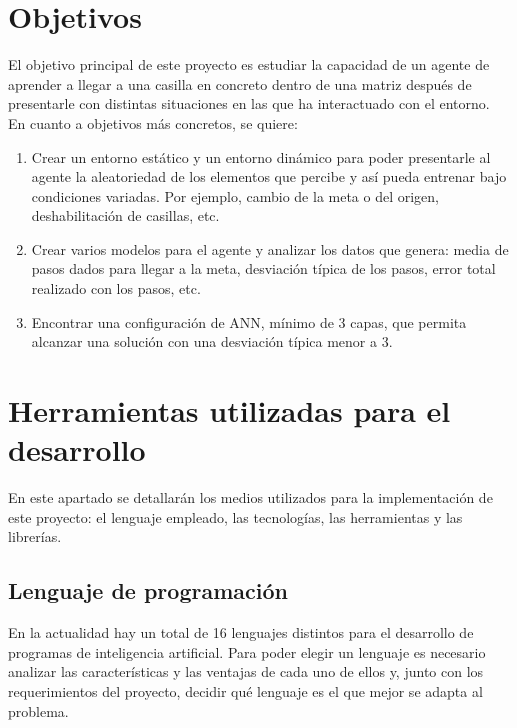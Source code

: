 \section{Objetivos}

El objetivo principal de este proyecto es estudiar la capacidad de un agente de aprender a llegar a una casilla en concreto dentro de una matriz después de presentarle con distintas situaciones en las que ha interactuado con el entorno. \\

En cuanto a objetivos más concretos, se quiere:

\begin{enumerate}
    \item Crear un entorno estático y un entorno dinámico para poder presentarle al agente la aleatoriedad de los elementos que percibe y así pueda entrenar bajo condiciones variadas. Por ejemplo, cambio de la meta o del origen, deshabilitación de casillas, etc. 
    
    \item Crear varios modelos para el agente y analizar los datos que genera: media de pasos dados para llegar a la meta, desviación típica de los pasos, error total realizado con los pasos, etc. 
    
    \item Encontrar una configuración de ANN, mínimo de 3 capas, que permita alcanzar una solución con una desviación típica menor a 3.
\end{enumerate}

\section{Herramientas utilizadas para el desarrollo}

En este apartado se detallarán los medios utilizados para la implementación de este proyecto: el lenguaje empleado, las tecnologías, las herramientas y las librerías. 
\subsection{Lenguaje de programación} 

En la actualidad hay un total de 16 lenguajes distintos para el desarrollo de programas de inteligencia artificial. Para poder elegir un lenguaje es necesario analizar las características y las ventajas de cada uno de ellos y, junto con los requerimientos del proyecto, decidir qué lenguaje es el que mejor se adapta al problema. \\

